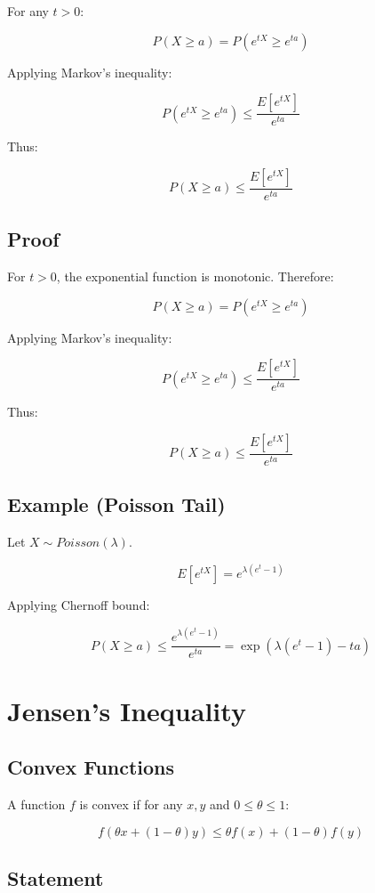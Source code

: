 \documentclass[12pt]{article}
\begin{document}
For any $t > 0$:

\[
P(X \ge a) = P(e^{tX} \ge e^{ta})
\]

Applying Markov’s inequality:

\[
P(e^{tX} \ge e^{ta}) \le \frac{E[e^{tX}]}{e^{ta}}
\]

Thus:

\[
P(X \ge a) \le \frac{E[e^{tX}]}{e^{ta}}
\]

\subsection*{Proof}

For $t > 0$, the exponential function is monotonic. Therefore:

\[
P(X \ge a) = P(e^{tX} \ge e^{ta})
\]

Applying Markov’s inequality:

\[
P(e^{tX} \ge e^{ta}) \le \frac{E[e^{tX}]}{e^{ta}}
\]

Thus:

\[
P(X \ge a) \le \frac{E[e^{tX}]}{e^{ta}}
\]

\subsection*{Example (Poisson Tail)}

Let $X \sim Poisson(\lambda)$.

\[
E[e^{tX}] = e^{\lambda(e^t - 1)}
\]

Applying Chernoff bound:

\[
P(X \ge a) \le \frac{e^{\lambda(e^t - 1)}}{e^{ta}}
= \exp(\lambda(e^t - 1) - ta)
\]

\section*{Jensen’s Inequality}

\subsection*{Convex Functions}

A function $f$ is convex if for any $x, y$ and $0 \le \theta \le 1$:

\[
f(\theta x + (1 - \theta)y) \le \theta f(x) + (1 - \theta) f(y)
\]

\subsection*{Statement}
\end{document}

